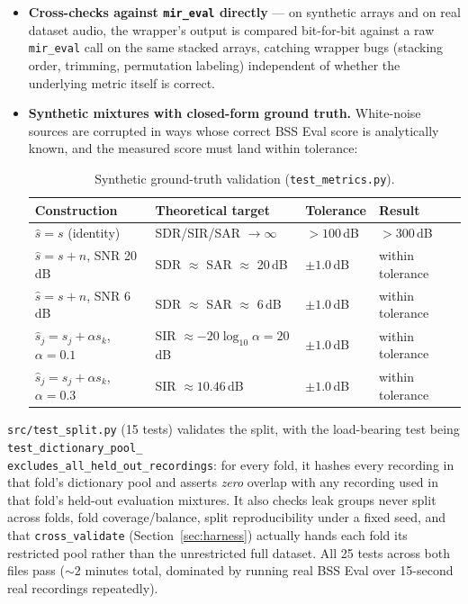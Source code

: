 \documentclass[11pt]{article}
\begin{document}
\begin{itemize}
  \item \textbf{Cross-checks against \texttt{mir\_eval} directly} --- on
    synthetic arrays and on real dataset audio, the wrapper's output is
    compared bit-for-bit against a raw \texttt{mir\_eval} call on the same
    stacked arrays, catching wrapper bugs (stacking order, trimming,
    permutation labeling) independent of whether the underlying metric
    itself is correct.
  \item \textbf{Synthetic mixtures with closed-form ground truth.} White-noise
    sources are corrupted in ways whose correct BSS Eval score is
    analytically known, and the measured score must land within tolerance:

  \begin{table}[H]
  \centering
  \caption{Synthetic ground-truth validation (\texttt{test\_metrics.py}).}
  \label{tab:synthtests}
  \begin{tabular}{@{}llll@{}}
  \toprule
  Construction & Theoretical target & Tolerance & Result \\
  \midrule
  $\hat{s}=s$ (identity) & SDR/SIR/SAR $\to \infty$ & $>100$\,dB & $>300$\,dB \\
  $\hat{s}=s+n$, SNR 20\,dB & SDR $\approx$ SAR $\approx$ 20\,dB & $\pm 1.0$\,dB & within tolerance \\
  $\hat{s}=s+n$, SNR 6\,dB & SDR $\approx$ SAR $\approx$ 6\,dB & $\pm 1.0$\,dB & within tolerance \\
  $\hat{s}_j = s_j + \alpha s_k$, $\alpha{=}0.1$ & SIR $\approx -20\log_{10}\alpha = 20$\,dB & $\pm 1.0$\,dB & within tolerance \\
  $\hat{s}_j = s_j + \alpha s_k$, $\alpha{=}0.3$ & SIR $\approx 10.46$\,dB & $\pm 1.0$\,dB & within tolerance \\
  \bottomrule
  \end{tabular}
  \end{table}
\end{itemize}

\texttt{src/test\_split.py} (15 tests) validates the split, with the
load-bearing test being \texttt{test\_dictionary\_pool\_} \\
\texttt{excludes\_all\_held\_out\_recordings}: for every fold, it hashes
every recording in that fold's dictionary pool and asserts \emph{zero}
overlap with any recording used in that fold's held-out evaluation
mixtures. It also checks leak groups never split across folds, fold
coverage/balance, split reproducibility under a fixed seed, and that
\texttt{cross\_validate} (Section~\ref{sec:harness}) actually hands each
fold its restricted pool rather than the unrestricted full dataset. All 25
tests across both files pass ($\sim$2 minutes total, dominated by running
real BSS Eval over 15-second real recordings repeatedly).
\end{document}
